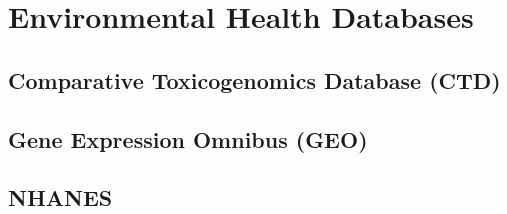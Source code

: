 \documentclass[
]{book}
\begin{document}
\hypertarget{environmental-health-databases}{%
\chapter{Environmental Health Databases}\label{environmental-health-databases}}

\hypertarget{comparative-toxicogenomics-database-ctd}{%
\section{Comparative Toxicogenomics Database (CTD)}\label{comparative-toxicogenomics-database-ctd}}

\hypertarget{gene-expression-omnibus-geo}{%
\section{Gene Expression Omnibus (GEO)}\label{gene-expression-omnibus-geo}}

\hypertarget{nhanes}{%
\section{NHANES}\label{nhanes}}
\end{document}
